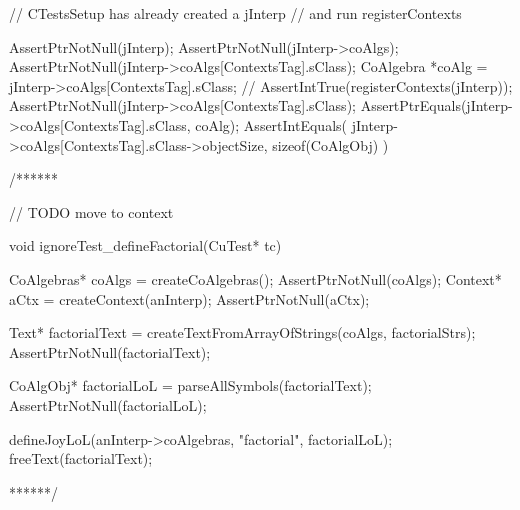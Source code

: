 
\startCTest
  // CTestsSetup has already created a jInterp
  // and run registerContexts
  
  AssertPtrNotNull(jInterp);
  AssertPtrNotNull(jInterp->coAlgs);
  AssertPtrNotNull(jInterp->coAlgs[ContextsTag].sClass);
  CoAlgebra *coAlg = jInterp->coAlgs[ContextsTag].sClass;
//  AssertIntTrue(registerContexts(jInterp));
  AssertPtrNotNull(jInterp->coAlgs[ContextsTag].sClass);
  AssertPtrEquals(jInterp->coAlgs[ContextsTag].sClass, coAlg);
  AssertIntEquals(
    jInterp->coAlgs[ContextsTag].sClass->objectSize,
    sizeof(CoAlgObj)
  )
\stopCTest

\stopTestCase
\stopTestSuite


\starttyping
/******

// TODO move to context


void ignoreTest_defineFactorial(CuTest* tc) {
  CoAlgebras* coAlgs = createCoAlgebras();
  AssertPtrNotNull(coAlgs);
  Context* aCtx = createContext(anInterp);
  AssertPtrNotNull(aCtx);

  Text* factorialText = createTextFromArrayOfStrings(coAlgs, factorialStrs);
  AssertPtrNotNull(factorialText);

  CoAlgObj* factorialLoL = parseAllSymbols(factorialText);
  AssertPtrNotNull(factorialLoL);

  defineJoyLoL(anInterp->coAlgebras, "factorial", factorialLoL);
  freeText(factorialText);
}
******/
\stoptyping
